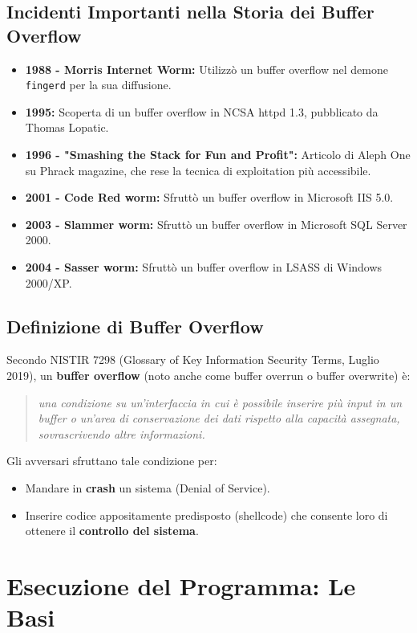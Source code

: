 \subsection{Incidenti Importanti nella Storia dei Buffer Overflow}
\begin{itemize}
    \item \textbf{1988 - Morris Internet Worm:} Utilizzò un buffer overflow nel demone \texttt{fingerd} per la sua diffusione.
    \item \textbf{1995:} Scoperta di un buffer overflow in NCSA httpd 1.3, pubblicato da Thomas Lopatic.
    \item \textbf{1996 - "Smashing the Stack for Fun and Profit":} Articolo di Aleph One su Phrack magazine, che rese la tecnica di exploitation più accessibile.
    \item \textbf{2001 - Code Red worm:} Sfruttò un buffer overflow in Microsoft IIS 5.0.
    \item \textbf{2003 - Slammer worm:} Sfruttò un buffer overflow in Microsoft SQL Server 2000.
    \item \textbf{2004 - Sasser worm:} Sfruttò un buffer overflow in LSASS di Windows 2000/XP.
\end{itemize}

\subsection{Definizione di Buffer Overflow}
Secondo NISTIR 7298 (Glossary of Key Information Security Terms, Luglio 2019), un \textbf{buffer overflow} (noto anche come buffer overrun o buffer overwrite) è:
\begin{quote}
    \textit{una condizione su un'interfaccia in cui è possibile inserire più input in un buffer o un'area di conservazione dei dati rispetto alla capacità assegnata, sovrascrivendo altre informazioni.}
\end{quote}
Gli avversari sfruttano tale condizione per:
\begin{itemize}
    \item Mandare in \textbf{crash} un sistema (Denial of Service).
    \item Inserire codice appositamente predisposto (shellcode) che consente loro di ottenere il \textbf{controllo del sistema}.
\end{itemize}

\newpage
\section{Esecuzione del Programma: Le Basi}


